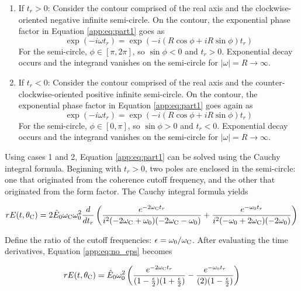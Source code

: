 \documentclass[amsmath,amssymb,aps,prd,10pt,twocolumn]{revtex4}
\begin{document}
\begin{enumerate}
\item If $t_r > 0$: Consider the contour comprised of the real axis and the clockwise-oriented negative infinite semi-circle.  On the contour, the exponential phase factor in Equation \ref{app:eq:part1} goes as
\begin{equation}
\exp(-i\omega t_r) = \exp(-i(R\cos\phi +iR\sin\phi) t_r)
\end{equation}
For the semi-circle, $\phi \in [\pi,2\pi]$, so $\sin\phi < 0$ and $t_r > 0$.  Exponential decay occurs and the integrand vanishes on the semi-circle for $|\omega| = R \to \infty$.
\item If $t_r < 0$: Consider the contour comprised of the real axis and the counter-clockwise-oriented positive infinite semi-circle.  On the contour, the exponential phase factor in Equation \ref{app:eq:part1} goes again as
\begin{equation}
\exp(-i\omega t_r) = \exp(-i(R\cos\phi +iR\sin\phi) t_r)
\end{equation}
For the semi-circle, $\phi \in [0,\pi]$, so $\sin\phi > 0$ and $t_r < 0$.  Exponential decay occurs and the integrand vanishes on the semi-circle for $|\omega| = R \to \infty$.
\end{enumerate}

Using cases 1 and 2, Equation \ref{app:eq:part1} can be solved using the Cauchy integral formula.  Beginning with $t_r > 0$, two poles are enclosed in the semi-circle: one that originated from the coherence cutoff frequency, and the other that originated from the form factor.  The Cauchy integral formula yields

\begin{widetext}
\begin{equation}
r E(t,\theta_{\rm C}) = 2 \hat{E}_0 \omega_{\rm C} \omega_{\rm 0}^2 \frac{d}{dt_r} \left( \frac{e^{-2\omega_{\rm C} t_r} }{i^2(-2\omega_{\rm C} + \omega_{\rm 0})(-2\omega_{\rm C}-\omega_{\rm 0})} + \frac{e^{-\omega_{\rm 0}t_r}}{i^2(-\omega_{\rm 0} + 2\omega_{\rm C})(-2\omega_{\rm 0})} \right) \label{app:eq:no_eps}
\end{equation}
\end{widetext}

Define the ratio of the cutoff frequencies: $\epsilon = \omega_{\rm 0}/\omega_{\rm C}$.  After evaluating the time derivatives, Equation \ref{app:eq:no_eps} becomes

\begin{equation}
r E(t,\theta_{\rm C}) = \hat{E}_0 \omega_{\rm 0}^2 \left( \frac{ e^{-2\omega_{\rm C} t_r} }{(1 -\frac{\epsilon}{2})(1+\frac{\epsilon}{2})} - \frac{e^{-\omega_{\rm 0}t_r}}{(2)(1-\frac{\epsilon}{2})} \right) \label{app:eq:yes_eps}
\end{equation}
\end{document}

